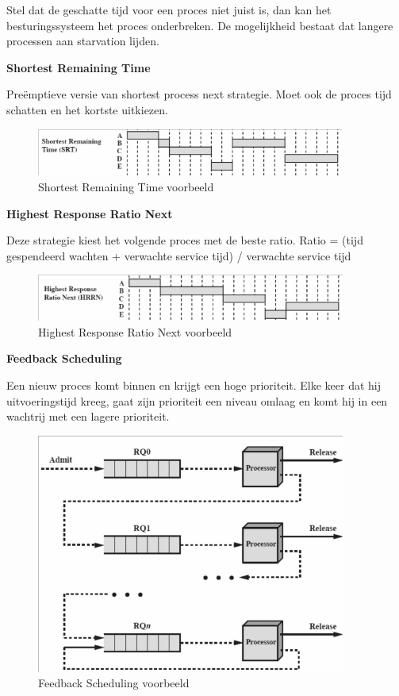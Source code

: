 Stel dat de geschatte tijd voor een proces niet juist is, dan kan het besturingssysteem het proces onderbreken. De mogelijkheid bestaat dat langere processen aan starvation lijden.

\textbf{Shortest Remaining Time}

Preëmptieve versie van shortest process next strategie. Moet ook de proces tijd schatten en het kortste uitkiezen.

\begin{figure}[htp]
    \centering
            \includegraphics[width=4in]{img/srt.png}
        \caption{Shortest Remaining Time voorbeeld}
    \label{fig:Shortest Remaining Time voorbeeld}
\end{figure}

\textbf{Highest Response Ratio Next}

Deze strategie kiest het volgende proces met de beste ratio.
Ratio = (tijd gespendeerd wachten + verwachte service tijd) / verwachte service tijd

\begin{figure}[htp]
    \centering
            \includegraphics[width=4in]{img/hrrn.png}
        \caption{Highest Response Ratio Next voorbeeld}
    \label{fig:Highest Response Ratio Next voorbeeld}
\end{figure}

\textbf{Feedback Scheduling}

Een nieuw proces komt binnen en krijgt een hoge prioriteit. Elke keer dat hij uitvoeringstijd kreeg, gaat zijn prioriteit een niveau omlaag en komt hij in een wachtrij met een lagere prioriteit.


\begin{figure}[htp]
    \centering
            \includegraphics[width=4in]{img/feedbackscheduling.png}
        \caption{Feedback Scheduling voorbeeld}
    \label{fig:Feedback Scheduling voorbeeld}
\end{figure}

